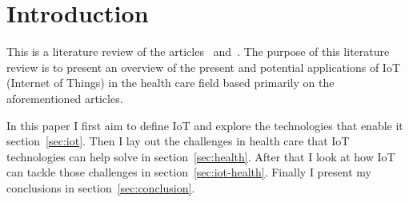 \section{Introduction}
This is a literature review of the articles~\cite{Bui2011}
and~\cite{Islam2015}. The purpose of this literature review is to present an
overview of the present and potential applications of IoT (Internet of Things) in the
health care field based primarily on the aforementioned articles.

In this paper I first aim to define IoT and explore the technologies that
enable it section~\ref{sec:iot}. Then I lay out the challenges in health care
that IoT technologies can help solve in section~\ref{sec:health}. After that I
look at how IoT can tackle those challenges in section~\ref{sec:iot-health}.
Finally I present my conclusions in section~\ref{sec:conclusion}.
